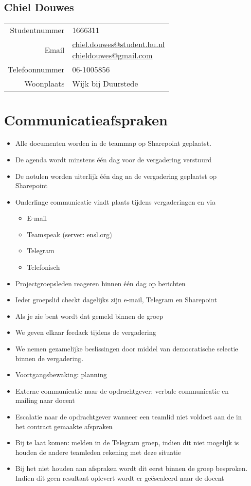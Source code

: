 \documentclass[dutch]{hu}
\begin{document}
\section*{Chiel Douwes}
\begin{tabular}{ r | l }
Studentnummer & 1666311 \\
Email & \makecell[l]{ 
	\href{mailto:chiel.douwes@student.hu.nl}{chiel.douwes@student.hu.nl} \\ 
	\href{mailto:chieldouwes@gmail.com}{chieldouwes@gmail.com}
} \\
Telefoonnummer & 06-1005856 \\
Woonplaats & Wijk bij Duurstede
\end{tabular}

\chapter{Communicatieafspraken}
\begin{itemize}
	\item Alle documenten worden in de teammap op Sharepoint geplaatst.
	\item De agenda wordt minstens één dag voor de vergadering verstuurd
	\item De notulen worden uiterlijk één dag na de vergadering geplaatst op Sharepoint
	\item Onderlinge communicatie vindt plaats tijdens vergaderingen en via 
		\begin{itemize}
		\item E-mail
		\item Teamspeak (server: ensl.org)
		\item Telegram
		\item Telefonisch
		\end{itemize}
	\item Projectgroepsleden reageren binnen één dag op berichten
	\item Ieder groepslid checkt dagelijks zijn e-mail, Telegram en Sharepoint
	\item Als je zie bent wordt dat gemeld binnen de groep
	\item We geven elkaar feedack tijdens de vergadering
	\item We nemen gezamelijke beslissingen door middel van democratische selectie binnen de vergadering.
	\item Voortgangsbewaking: planning
	\item Externe communicatie naar de opdrachtgever: verbale communicatie en mailing naar docent
	\item Escalatie naar de opdrachtgever wanneer een teamlid niet voldoet aan  de in het contract gemaakte afspraken
	\item Bij te laat komen: melden in de Telegram groep, indien dit niet mogelijk is houden de andere teamleden rekening met deze situatie
	\item Bij het niet houden aan afspraken wordt dit eerst binnen de groep besproken. Indien dit geen resultaat oplevert wordt er geëscaleerd naar de docent

\end{itemize}
\end{document}
